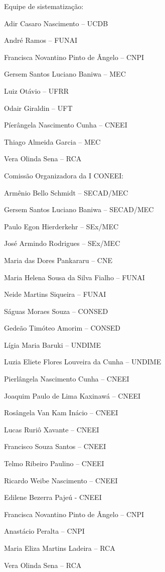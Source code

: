 \documentclass[
]{book}
\begin{document}
Equipe de sistematização:

Adir Casaro Nascimento -- UCDB

André Ramos -- FUNAI

Francisca Novantino Pinto de Ângelo -- CNPI

Gersem Santos Luciano Baniwa -- MEC

Luiz Otávio -- UFRR

Odair Giraldin -- UFT

Píerângela Nascimento Cunha -- CNEEI

Thiago Almeida Garcia -- MEC

Vera Olinda Sena -- RCA

Comissão Organizadora da I CONEEI:

Armênio Bello Schmidt -- SECAD/MEC

Gersem Santos Luciano Baniwa -- SECAD/MEC

Paulo Egon Hierderkehr -- SEx/MEC

José Armindo Rodrigues -- SEx/MEC

Maria das Dores Pankararu -- CNE

Maria Helena Sousa da Silva Fialho -- FUNAI

Neide Martins Siqueira -- FUNAI

Ságuas Moraes Souza -- CONSED

Gedeão Timóteo Amorim -- CONSED

Lígia Maria Baruki -- UNDIME

Luzia Eliete Flores Louveira da Cunha -- UNDIME

Pierlângela Nascimento Cunha -- CNEEI

Joaquim Paulo de Lima Kaxinawá -- CNEEI

Rosângela Van Kam Inácio -- CNEEI

Lucas Ruriô Xavante -- CNEEI

Francisco Souza Santos -- CNEEI

Telmo Ribeiro Paulino -- CNEEI

Ricardo Weibe Nascimento -- CNEEI

Edilene Bezerra Pajeú - CNEEI

Francisca Novantino Pinto de Ângelo -- CNPI

Anastácio Peralta -- CNPI

Maria Eliza Martins Ladeira -- RCA

Vera Olinda Sena -- RCA
\end{document}

